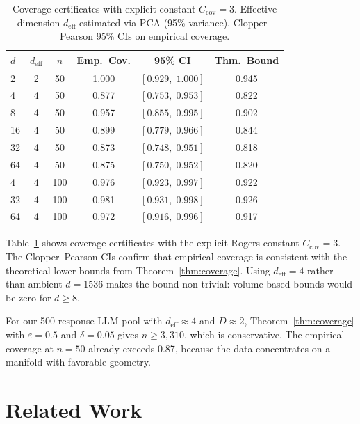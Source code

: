 \documentclass[10pt]{article}
\begin{document}
\begin{table}[t]
\centering
\caption{Coverage certificates with explicit constant $C_{\mathrm{cov}} = 3$.
Effective dimension $d_{\mathrm{eff}}$ estimated via PCA (95\% variance).
Clopper--Pearson 95\% CIs on empirical coverage.}
\label{tab:coverage}
\begin{tabular}{lccccc}
\toprule
\textbf{$d$} & \textbf{$d_{\mathrm{eff}}$} & \textbf{$n$} & \textbf{Emp.\ Cov.} & \textbf{95\% CI} & \textbf{Thm.\ Bound} \\
\midrule
2   & 2  & 50  & 1.000 & $[0.929,\; 1.000]$ & 0.945 \\
4   & 4  & 50  & 0.877 & $[0.753,\; 0.953]$ & 0.822 \\
8   & 4  & 50  & 0.957 & $[0.855,\; 0.995]$ & 0.902 \\
16  & 4  & 50  & 0.899 & $[0.779,\; 0.966]$ & 0.844 \\
32  & 4  & 50  & 0.873 & $[0.748,\; 0.951]$ & 0.818 \\
64  & 4  & 50  & 0.875 & $[0.750,\; 0.952]$ & 0.820 \\
\midrule
4   & 4  & 100 & 0.976 & $[0.923,\; 0.997]$ & 0.922 \\
32  & 4  & 100 & 0.981 & $[0.931,\; 0.998]$ & 0.926 \\
64  & 4  & 100 & 0.972 & $[0.916,\; 0.996]$ & 0.917 \\
\bottomrule
\end{tabular}
\end{table}

Table~\ref{tab:coverage} shows coverage certificates with the explicit Rogers constant $C_{\mathrm{cov}} = 3$.
The Clopper--Pearson CIs confirm that empirical coverage is consistent with the theoretical lower bounds from Theorem~\ref{thm:coverage}.
Using $d_{\mathrm{eff}} = 4$ rather than ambient $d = 1536$ makes the bound non-trivial: volume-based bounds would be zero for $d \geq 8$.

For our 500-response LLM pool with $d_{\mathrm{eff}} \approx 4$ and $D \approx 2$, Theorem~\ref{thm:coverage} with $\varepsilon = 0.5$ and $\delta = 0.05$ gives $n \geq 3{,}310$, which is conservative.
The empirical coverage at $n = 50$ already exceeds 0.87, because the data concentrates on a manifold with favorable geometry.

\section{Related Work}
\label{sec:related}
\end{document}

